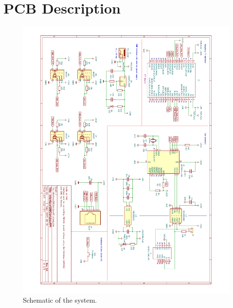 \section{PCB Description}


\begin{figure}[h!]
	\centering
	\includegraphics[width=1.00\linewidth]{../../pcb/InterfaceS88GleisboxRPi/InterfaceS88GleisboxRPi.pdf}
	\caption{Schematic of the system.}
	\label{fig:pcbschematic}
\end{figure}